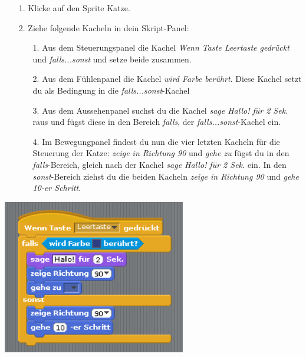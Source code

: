 \begin{itemize}
\item[1. ] Klicke auf den Sprite Katze.
\item[2. ] Ziehe folgende Kacheln in dein Skript-Panel:
  \begin{itemize}
  \item[1. ] Aus dem Steuerungspanel die Kachel \textit{Wenn Taste Leertaste gedr{\"u}ckt} und \textit{falls...sonst} und setze beide zusammen.
  \item[2. ] Aus dem F{\"u}hlenpanel die Kachel \textit{wird Farbe ber{\"u}hrt}. Diese Kachel setzt du als Bedingung in die \textit{falls...sonst}-Kachel
  \item[3. ] Aus dem Aussehenpanel suchst du die Kachel \textit{sage Hallo! f{\"u}r 2 Sek.} raus und f{\"u}gst diese in den Bereich \textit{falls}, der \textit{falls...sonst}-Kachel ein.
  \item[4. ] Im Bewegungpanel findest du nun die vier letzten Kacheln f{\"u}r die Steuerung der Katze: \textit{zeige in Richtung 90} und \textit{gehe zu} f{\"u}gst du in den \textit{falls}-Bereich, gleich nach der Kachel \textit{sage Hallo! f{\"u}r 2 Sek.} ein. In den \textit{sonst}-Bereich ziehst du die beiden Kacheln \textit{zeige in Richtung 90} und \textit{gehe 10-er Schritt}.
  \end{itemize}
\end{itemize}
\includegraphics[width=0.6\textwidth]{images/aufgabe4_katze_bewegung_default.png}
